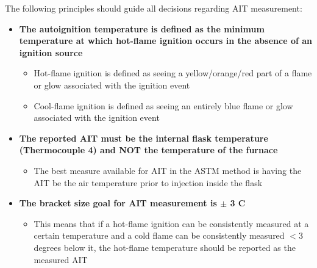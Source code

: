 \documentclass[letterpaper,11pt]{article}
\begin{document}
The following principles should guide all decisions regarding AIT measurement:
\begin{itemize}
\item \textbf{The autoignition temperature is defined as the minimum temperature 
    at which hot-flame ignition occurs in the absence of an ignition source}
    \begin{itemize}
    \item Hot-flame ignition is defined as seeing a yellow/orange/red part of a 
        flame or glow associated with the ignition event
    \item Cool-flame ignition is defined as seeing an entirely blue flame or 
        glow associated with the ignition event
    \end{itemize}
\item \textbf{The reported AIT must be the internal flask temperature 
    (Thermocouple 4) and NOT the temperature of the furnace}
    \begin{itemize}
    \item The best measure available for AIT in the ASTM method is having the
        AIT be the air temperature prior to injection inside the flask
    \end{itemize}

\item \textbf{The bracket size goal for AIT measurement is $\pm$ 3 \degree C}
    \begin{itemize}
    \item This means that if a hot-flame ignition can be consistently measured  
        at a certain temperature and a cold flame can be consistently measured  
        $< 3$ degrees below it, the hot-flame temperature should be reported as 
        the measured AIT
    \end{itemize}
\end{itemize}
    
\end{document}
